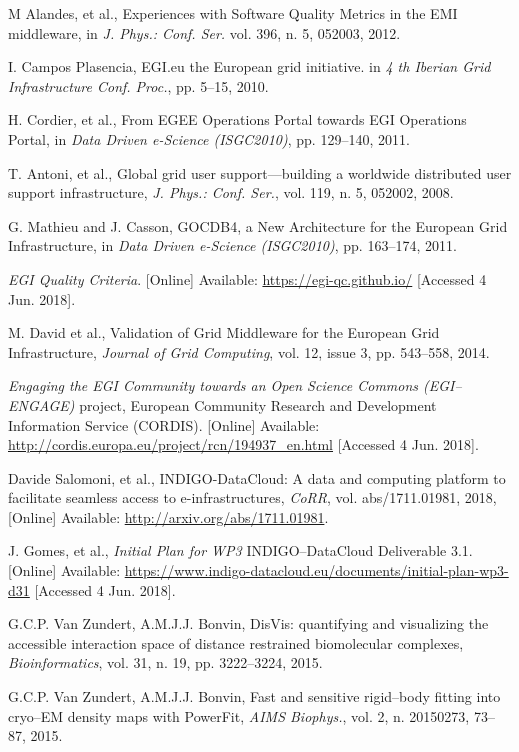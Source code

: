 \documentclass[journal]{IEEEtran}
\begin{document}
\begin{thebibliography}{1}
M Alandes, et al.,
Experiences with Software Quality Metrics in the EMI middleware,
in \emph{J. Phys.: Conf. Ser.}
vol. 396, n. 5, 052003, 2012.

I. Campos Plasencia,
EGI.eu the European grid initiative.
in \emph{4 th Iberian Grid Infrastructure Conf. Proc.},
pp. 5--15, 2010.

H. Cordier, et al.,
From EGEE Operations Portal towards EGI Operations Portal,
in \emph{Data Driven e-Science (ISGC2010)},
pp. 129--140, 2011.

T. Antoni, et al.,
Global grid user support—building a worldwide distributed user support infrastructure,
\emph{J. Phys.: Conf. Ser.},
vol. 119, n. 5, 052002, 2008.

G. Mathieu and J. Casson,
GOCDB4, a New Architecture for the European Grid Infrastructure,
in \emph{Data Driven e-Science (ISGC2010)},
pp. 163--174, 2011.

\emph{EGI Quality Criteria}.
[Online] Available: \url{https://egi-qc.github.io/}
[Accessed 4 Jun. 2018].

M. David et al.,
Validation of Grid Middleware for the European Grid Infrastructure,
\emph{Journal of Grid Computing},
vol. 12, issue 3, pp. 543--558, 2014.

\emph{Engaging the EGI Community towards an Open Science Commons (EGI--ENGAGE)}
project, European Community Research and Development Information Service (CORDIS).
[Online] Available: \url{http://cordis.europa.eu/project/rcn/194937\_en.html}
[Accessed 4 Jun. 2018].

Davide Salomoni, et al.,
INDIGO-DataCloud: {A} data and computing platform to facilitate seamless access to e-infrastructures,
\emph{CoRR},
vol. abs/1711.01981, 2018,
[Online] Available: \url{http://arxiv.org/abs/1711.01981}.

J. Gomes, et al.,
\emph{Initial Plan for WP3} INDIGO--DataCloud Deliverable 3.1.
[Online] Available: \url{https://www.indigo-datacloud.eu/documents/initial-plan-wp3-d31}
[Accessed 4 Jun. 2018].

G.C.P. Van Zundert, A.M.J.J. Bonvin,
DisVis: quantifying and visualizing the accessible interaction space of distance
restrained biomolecular complexes,
\emph{Bioinformatics}, vol. 31, n. 19, pp. 3222--3224, 2015.

G.C.P. Van Zundert, A.M.J.J. Bonvin,
Fast and sensitive rigid--body fitting into cryo--EM density maps with PowerFit,
\emph{AIMS Biophys.}, vol. 2, n. 20150273, 73--87, 2015.

\end{thebibliography}
\end{document}
